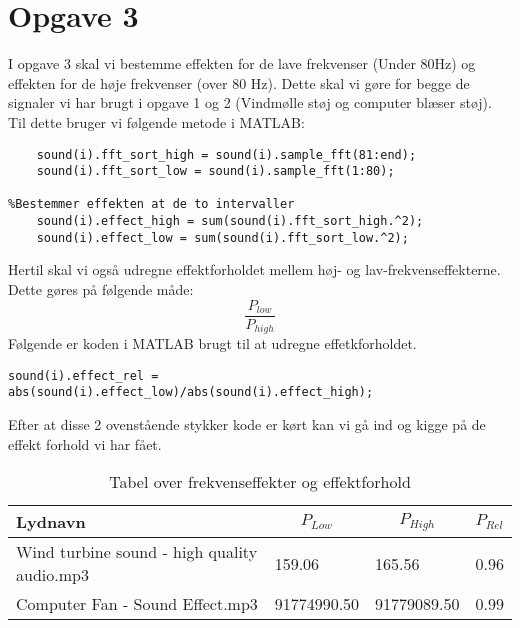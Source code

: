 \documentclass[../main.tex]{subfiles}
\begin{document}
\section{Opgave 3}
I opgave 3 skal vi bestemme effekten for de lave frekvenser (Under 80Hz) og effekten for de høje frekvenser (over 80 Hz).
Dette skal vi gøre for begge de signaler vi har brugt i opgave 1 og 2 (Vindmølle støj og computer blæser støj).
Til dette bruger vi følgende metode i MATLAB:

\begin{lstlisting}[caption=Udregning af frekvens effekter, label=lst:freqEffect]
%Opstiller frekvenser over 80 H< og under 80Hz
    sound(i).fft_sort_high = sound(i).sample_fft(81:end);
    sound(i).fft_sort_low = sound(i).sample_fft(1:80);

%Bestemmer effekten at de to intervaller
    sound(i).effect_high = sum(sound(i).fft_sort_high.^2);
    sound(i).effect_low = sum(sound(i).fft_sort_low.^2);
\end{lstlisting}

Hertil skal vi også udregne effektforholdet mellem høj- og lav-frekvenseffekterne. 
Dette gøres på følgende måde:
\[
    \frac{P_{low}}{P_{high}}
\]
Følgende er koden i MATLAB brugt til at udregne effetkforholdet.
\begin{lstlisting}[caption=Udregning af effektforhold, label=lst:effectRel]
% Calculate the effekt relation
sound(i).effect_rel = abs(sound(i).effect_low)/abs(sound(i).effect_high);
\end{lstlisting}

Efter at disse 2 ovenstående stykker kode er kørt kan vi gå ind og kigge på de effekt forhold vi har fået.

\begin{table}[h]
    \centering
    \begin{tabular}{|p{6cm}|lll|}
    \hline
    Lydnavn                                     & \multicolumn{1}{c|}{$P_{Low}$}       & \multicolumn{1}{c|}{$P_{High}$}      & $P_{Rel}$        \\ \hline
    Wind turbine sound - high quality audio.mp3 & 159.06 & 165.56 & 0.96 \\ \hline
    Computer Fan - Sound Effect.mp3             & 91774990.50  & 91779089.50 & 0.99 \\ \hline
    \end{tabular}%
    \caption{Tabel over frekvenseffekter og effektforhold}
    \label{tab:effectTabel}
\end{table}
\end{document}
